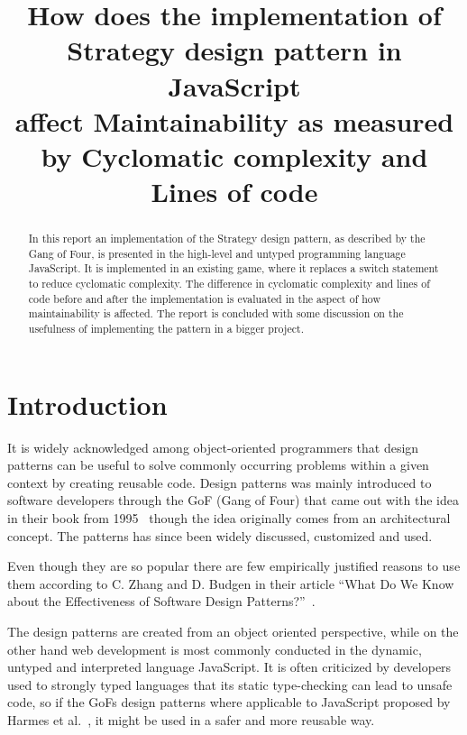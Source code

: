 \documentclass[conference, a4paper]{IEEEtran}
\begin{document}
\title{How does the implementation of\\
Strategy design pattern in JavaScript\\
affect Maintainability as measured by Cyclomatic complexity and Lines of code}
\author{
}

\maketitle

\begin{abstract}
	 In this report an implementation of the Strategy design pattern, as described by the Gang of Four, is presented in the high-level and untyped programming language JavaScript. It is implemented in an existing game, where it replaces a switch statement to reduce cyclomatic complexity. The difference in cyclomatic complexity and lines of code before and after the implementation is evaluated in the aspect of how maintainability is affected. The report is concluded with some discussion on the usefulness of implementing the pattern in a bigger project.
\end{abstract}

\section{Introduction}
\label{sec:Introduction}
It is widely acknowledged among object-oriented programmers that design patterns can be useful to solve commonly occurring problems within a given context  by creating reusable code. Design patterns was mainly introduced to software developers through the GoF (Gang of Four) that came out with the idea in their book from 1995~\cite{bibitem:GoF} though the idea originally comes from an architectural concept. The patterns has since been widely discussed, customized and used.

Even though they are so popular there are few empirically justified reasons to use them according to C. Zhang and D. Budgen in their article ``What Do We Know about the Effectiveness of Software Design Patterns?''~\cite{bibitem:Zhang}.

The design patterns are created from an object oriented perspective, while on the other hand web development is most commonly conducted in the dynamic, untyped and interpreted language JavaScript. It is often criticized by developers used to strongly typed languages that its static type-checking can lead to unsafe code, so if the GoFs design patterns where applicable to JavaScript proposed by Harmes et al.~\cite{bibitem:DiazHarmes}, it might be used in a safer and more reusable way.
\end{document}
